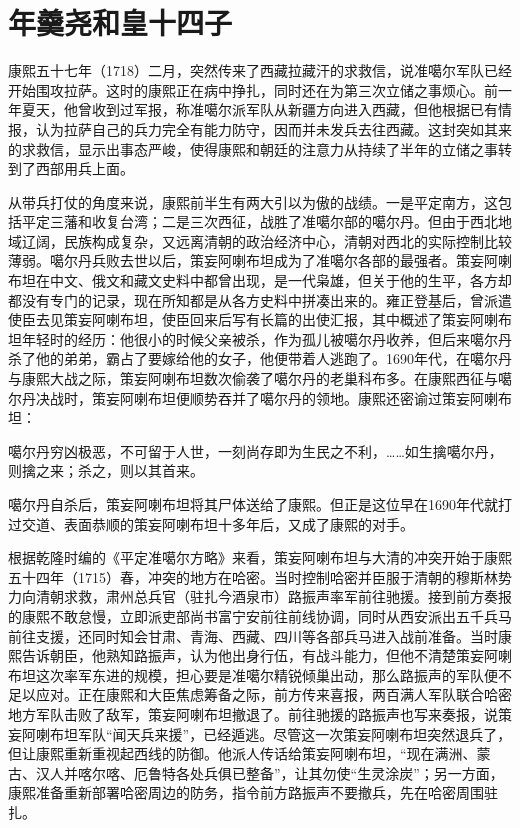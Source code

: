 \chapter{年羹尧和皇十四子}

康熙五十七年（1718）二月，突然传来了西藏拉藏汗的求救信，说准噶尔军队已经开始围攻拉萨。这时的康熙正在病中挣扎，同时还在为第三次立储之事烦心。前一年夏天，他曾收到过军报，称准噶尔派军队从新疆方向进入西藏，但他根据已有情报，认为拉萨自己的兵力完全有能力防守，因而并未发兵去往西藏。这封突如其来的求救信，显示出事态严峻，使得康熙和朝廷的注意力从持续了半年的立储之事转到了西部用兵上面。



从带兵打仗的角度来说，康熙前半生有两大引以为傲的战绩。一是平定南方，这包括平定三藩和收复台湾；二是三次西征，战胜了准噶尔部的噶尔丹。但由于西北地域辽阔，民族构成复杂，又远离清朝的政治经济中心，清朝对西北的实际控制比较薄弱。噶尔丹兵败去世以后，策妄阿喇布坦成为了准噶尔各部的最强者。策妄阿喇布坦在中文、俄文和藏文史料中都曾出现，是一代枭雄，但关于他的生平，各方却都没有专门的记录，现在所知都是从各方史料中拼凑出来的。雍正登基后，曾派遣使臣去见策妄阿喇布坦，使臣回来后写有长篇的出使汇报，其中概述了策妄阿喇布坦年轻时的经历：他很小的时候父亲被杀，作为孤儿被噶尔丹收养，但后来噶尔丹杀了他的弟弟，霸占了要嫁给他的女子，他便带着人逃跑了。1690年代，在噶尔丹与康熙大战之际，策妄阿喇布坦数次偷袭了噶尔丹的老巢科布多。在康熙西征与噶尔丹决战时，策妄阿喇布坦便顺势吞并了噶尔丹的领地。康熙还密谕过策妄阿喇布坦：



\begin{bookquote}噶尔丹穷凶极恶，不可留于人世，一刻尚存即为生民之不利，……如生擒噶尔丹，则擒之来；杀之，则以其首来。\end{bookquote}


噶尔丹自杀后，策妄阿喇布坦将其尸体送给了康熙。但正是这位早在1690年代就打过交道、表面恭顺的策妄阿喇布坦十多年后，又成了康熙的对手。



根据乾隆时编的《平定准噶尔方略》来看，策妄阿喇布坦与大清的冲突开始于康熙五十四年（1715）春，冲突的地方在哈密。当时控制哈密并臣服于清朝的穆斯林势力向清朝求救，肃州总兵官（驻扎今酒泉市）路振声率军前往驰援。接到前方奏报的康熙不敢怠慢，立即派吏部尚书富宁安前往前线协调，同时从西安派出五千兵马前往支援，还同时知会甘肃、青海、西藏、四川等各部兵马进入战前准备。当时康熙告诉朝臣，他熟知路振声，认为他出身行伍，有战斗能力，但他不清楚策妄阿喇布坦这次率军东进的规模，担心要是准噶尔精锐倾巢出动，那么路振声的军队便不足以应对。正在康熙和大臣焦虑筹备之际，前方传来喜报，两百满人军队联合哈密地方军队击败了敌军，策妄阿喇布坦撤退了。前往驰援的路振声也写来奏报，说策妄阿喇布坦军队“闻天兵来援”，已经遁逃。尽管这一次策妄阿喇布坦突然退兵了，但让康熙重新重视起西线的防御。他派人传话给策妄阿喇布坦，“现在满洲、蒙古、汉人并喀尔喀、厄鲁特各处兵俱已整备”，让其勿使“生灵涂炭”；另一方面，康熙准备重新部署哈密周边的防务，指令前方路振声不要撤兵，先在哈密周围驻扎。


